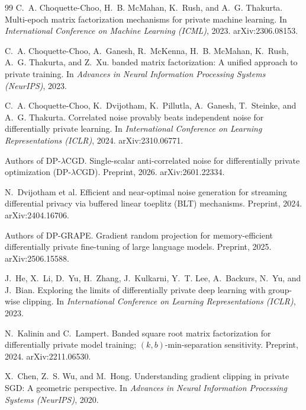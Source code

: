 \documentclass[11pt]{article}
\theoremstyle{plain}
\theoremstyle{definition}
\theoremstyle{remark}
\begin{document}
\begin{thebibliography}{99}
C.~A. Choquette-Choo, H.~B. McMahan, K.~Rush, and A.~G. Thakurta.
\newblock Multi-epoch matrix factorization mechanisms for private machine learning.
\newblock In \emph{International Conference on Machine Learning (ICML)}, 2023.
\newblock arXiv:2306.08153.

C.~A. Choquette-Choo, A.~Ganesh, R.~McKenna, H.~B. McMahan, K.~Rush, A.~G. Thakurta, and Z.~Xu.
 banded matrix factorization: A unified approach to private training.
\newblock In \emph{Advances in Neural Information Processing Systems (NeurIPS)}, 2023.

C.~A. Choquette-Choo, K.~Dvijotham, K.~Pillutla, A.~Ganesh, T.~Steinke, and A.~G. Thakurta.
\newblock Correlated noise provably beats independent noise for differentially private learning.
\newblock In \emph{International Conference on Learning Representations (ICLR)}, 2024.
\newblock arXiv:2310.06771.

Authors of {DP-$\lambda$CGD}.
\newblock Single-scalar anti-correlated noise for differentially private optimization (DP-$\lambda$CGD).
\newblock Preprint, 2026.
\newblock arXiv:2601.22334.

N.~Dvijotham et al.
\newblock Efficient and near-optimal noise generation for streaming differential privacy via buffered linear toeplitz (BLT) mechanisms.
\newblock Preprint, 2024.
\newblock arXiv:2404.16706.

Authors of {DP-GRAPE}.
\newblock Gradient random projection for memory-efficient differentially private fine-tuning of large language models.
\newblock Preprint, 2025.
\newblock arXiv:2506.15588.

J.~He, X.~Li, D.~Yu, H.~Zhang, J.~Kulkarni, Y.~T. Lee, A.~Backurs, N.~Yu, and J.~Bian.
\newblock Exploring the limits of differentially private deep learning with group-wise clipping.
\newblock In \emph{International Conference on Learning Representations (ICLR)}, 2023.

N.~Kalinin and C.~Lampert.
\newblock Banded square root matrix factorization for differentially private model training; $(k,b)$-min-separation sensitivity.
\newblock Preprint, 2024.
\newblock arXiv:2211.06530.

X.~Chen, Z.~S. Wu, and M.~Hong.
\newblock Understanding gradient clipping in private {SGD}: A geometric perspective.
\newblock In \emph{Advances in Neural Information Processing Systems (NeurIPS)}, 2020.


\end{thebibliography}
\end{document}
